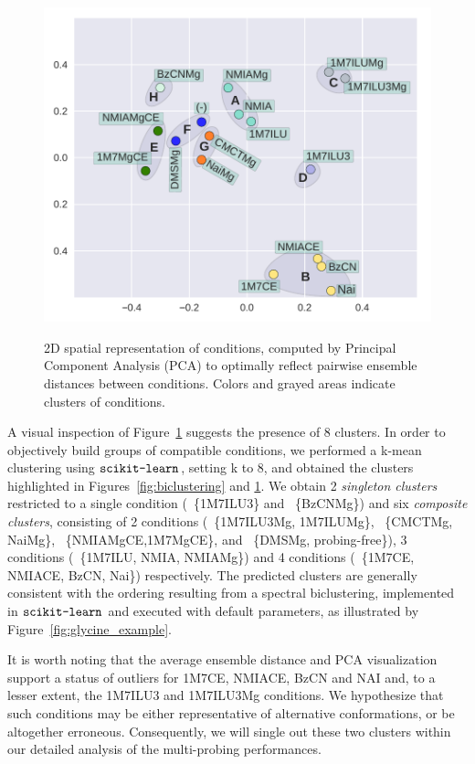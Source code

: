 \documentclass[a4,center,fleqn]{NAR}
\newcommand{\Software}[1]{$\text{\ttfamily #1}$}
\newcommand{\Def}[1]{{\em #1}}
\begin{document}
\begin{figure}
	{\centering \includegraphics[width=\linewidth]{graphs/didy/PCA}\\}%
	
	\caption{2D spatial representation of conditions, computed by Principal Component Analysis (PCA) to optimally reflect pairwise ensemble distances between conditions. Colors and grayed areas indicate clusters of conditions.}\label{fig:PCA}
\end{figure}

A visual inspection of Figure~\ref{fig:PCA} suggests the presence of 8 clusters. In order to objectively build groups of compatible conditions, we performed a k-mean clustering using \Software{scikit-learn}, setting k to 8, and obtained the clusters highlighted in Figures~\ref{fig:biclustering} and \ref{fig:PCA}.  We obtain 2 \Def{singleton clusters} restricted to a single condition (~\{1M7ILU3\} and ~\{BzCNMg\}) and six \Def{composite clusters}, consisting of 2 conditions (~\{1M7ILU3Mg, 1M7ILUMg\}, ~\{CMCTMg, NaiMg\}, ~\{NMIAMgCE,1M7MgCE\}, and ~\{DMSMg, probing-free\}), 3 conditions (~\{1M7ILU, NMIA, NMIAMg\}) and 4 conditions (~\{1M7CE, NMIACE, BzCN, Nai\}) respectively.  The predicted clusters are generally consistent with the ordering resulting from a spectral biclustering, implemented in \Software{scikit-learn} and executed with default parameters, as illustrated by Figure~\ref{fig:glycine_example}. 

It is worth noting that the average ensemble distance and PCA visualization support a status of outliers for 1M7CE, NMIACE, BzCN and NAI and, to a lesser extent, the 1M7ILU3 and 1M7ILU3Mg conditions.  We hypothesize that such conditions may be either representative of alternative conformations, or be altogether erroneous. Consequently, we will single out these two clusters within our detailed analysis of the multi-probing performances.
\end{document}
